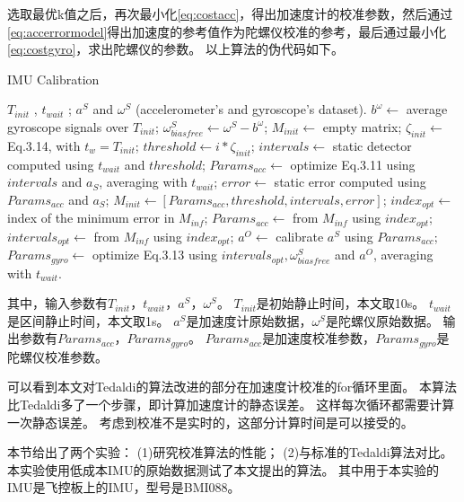 \documentclass[
  type=master
]{gdutthesis}
\begin{document}
选取最优k值之后，再次最小化\autoref{eq:costacc}，得出加速度计的校准参数，然后通过\autoref{eq:accerrormodel}得出加速度的参考值作为陀螺仪校准的参考，最后通过最小化\autoref{eq:costgyro}，求出陀螺仪的参数。
以上算法的伪代码如下。
\begin{algorithm}[H] 
	\caption{IMU Calibration} 
	\label{alg1} 
	\begin{algorithmic}
		\REQUIRE $T_{init}$ , $t_{wait}$ ; $a^S$ and $\omega^S$ (accelerometer's and
		gyroscope's dataset).
		\STATE $b^{\omega} \gets$ average gyroscope signals over $T_{init}$; 
		\STATE $\omega^S_{biasfree} \gets \omega^S - b^{\omega}$; 
		\STATE $M_{init} \gets$ empty matrix; 
		\STATE $\zeta_{init} \gets $ Eq.3.14, with $t_w = T_{init}$;
		\STATE $threshold \gets i*\zeta_{init}$;
		\STATE $intervals \gets$ static detector computed using $t_{wait}$ and $threshold$;
		\STATE $Params_{acc} \gets$ optimize Eq.3.11 using
		$intervals$ and $a_S$, averaging with $t_{wait}$; 
		\STATE $error \gets $ static error computed using $Params_{acc}$ and $a_S$;
		\STATE $M_{init} \gets [Params_{acc},threshold,intervals,error]$;
		\ENDFOR
		\STATE $index_{opt} \gets $ index of the minimum error in $M_{inf}$; 
		\STATE $Params_{acc} \gets $ from $M_{inf}$ using $index_{opt}$; 
		\STATE $intervals_{opt} \gets $ from $M_{inf}$ using $index_{opt}$; 
		\STATE $a^O \gets$ calibrate $a^S$ using $Params_{acc}$;
		\STATE $Params_{gyro} \gets $ optimize Eq.3.13 using $intervals_{opt},\omega^S_{biasfree}$ and $a^O$, averaging with $t_{wait}$. 
	\end{algorithmic} 
\end{algorithm}

其中，输入参数有$T_{init}$，$t_{wait}$，$a^S$，$\omega^S$。
$T_{init}$是初始静止时间，本文取10s。
$t_{wait}$是区间静止时间，本文取1s。
$a^S$是加速度计原始数据，$\omega^S$是陀螺仪原始数据。
输出参数有$Params_{acc}$，$Params_{gyro}$。
$Params_{acc}$是加速度校准参数，$Params_{gyro}$是陀螺仪校准参数。

可以看到本文对Tedaldi的算法改进的部分在加速度计校准的for循环里面。
本算法比Tedaldi多了一个步骤，即计算加速度计的静态误差。
这样每次循环都需要计算一次静态误差。
考虑到校准不是实时的，这部分计算时间是可以接受的。

本节给出了两个实验：
(1)研究校准算法的性能；
(2)与标准的Tedaldi算法对比。
本实验使用低成本IMU的原始数据测试了本文提出的算法。
其中用于本实验的IMU是飞控板上的IMU，型号是BMI088。
\end{document}
